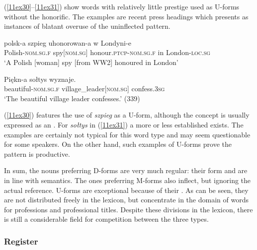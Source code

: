 \documentclass[output=paper,colorlinks,citecolor=brown]{langscibook}
\begin{document}
{\sloppy (\ref{11ex30}--\ref{11ex31}) show words with relatively little prestige used as U-forms without the honorific. The examples are recent press headings which \citet{szpyra-kozlowska2021} presents as instances of blatant overuse of the uninflected pattern.\par}

\begin{exe}
	\ex \label{11ex30}
	\gll polsk-a szpieg uhonorowan-a w Londyni-e \\
	Polish-\textsc{nom.sg.f} spy[\textsc{nom.sg}] honour.\textsc{ptcp-nom.sg.f} in London-\textsc{loc.sg} \\
	\trans ‘A Polish [woman] spy [from WW2] honoured in London’
	
	\hfill \citep[339]{szpyra-kozlowska2021}
	
	\ex \label{11ex31}
	\gll Piękn-a sołtys wyznaje. \\
	beautiful-\textsc{nom.sg.f} village\_leader[\textsc{nom.sg}] confess.\textsc{3sg} \\
	\trans ‘The beautiful village leader confesses.’ \hfill (339)
\end{exe}

(\ref{11ex30}) features the use of \emph{szpieg} as a U-form, although the concept is usually expressed as an . For \emph{sołtys} in (\ref{11ex31}) a more or less established  exists. The examples are certainly not typical for this word type and may seem questionable for some speakers. On the other hand, such examples of U-forms prove the pattern is productive.

In sum, the nouns preferring D-forms are very much regular: their form and  are in line with semantics. The ones preferring M-forms also inflect, but ignoring the actual  reference. U-forms are exceptional because of their . As can be seen, they are not distributed freely in the lexicon, but concentrate in the domain of words for professions and professional titles. Despite these divisions in the lexicon, there is still a considerable field for competition between the three types.

\subsubsection{Register} \label{11sec3.3.4}
\end{document}
